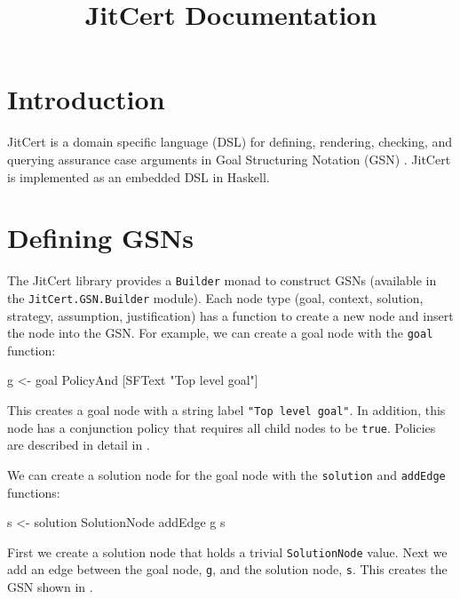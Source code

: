 \documentclass{article}
\newcommand{\jitcert}{JitCert\xspace}
\begin{document}
\title{\jitcert Documentation}


\maketitle

\section{Introduction}

\jitcert is a domain specific language (DSL) for defining, rendering, checking, and querying 
assurance case arguments in Goal Structuring Notation (GSN) \cite{kelly2004goal}. 
\jitcert is implemented as an embedded DSL in Haskell. 

\section{Defining GSNs}

The \jitcert library provides a \texttt{Builder} monad to construct GSNs (available in the \texttt{JitCert.GSN.Builder} module). 
Each node type (goal, context, solution, strategy, assumption, justification) has a function to create a new node and insert the node into the GSN. 
For example, we can create a goal node with the \texttt{goal} function:
\begin{mcode}
g <- goal PolicyAnd [SFText "Top level goal"]
\end{mcode}
This creates a goal node with a string label \texttt{"Top level goal"}. 
In addition, this node has a conjunction policy that requires all child nodes to be \texttt{true}. 
Policies are described in detail in . 

We can create a solution node for the goal node with the \texttt{solution} and \texttt{addEdge} functions:
\begin{mcode}
s <- solution SolutionNode
addEdge g s
\end{mcode}
First we create a solution node that holds a trivial \texttt{SolutionNode} value. %
Next we add an edge between the goal node, \texttt{g}, and the solution node, \texttt{s}.
This creates the GSN shown in . 
\end{document}
